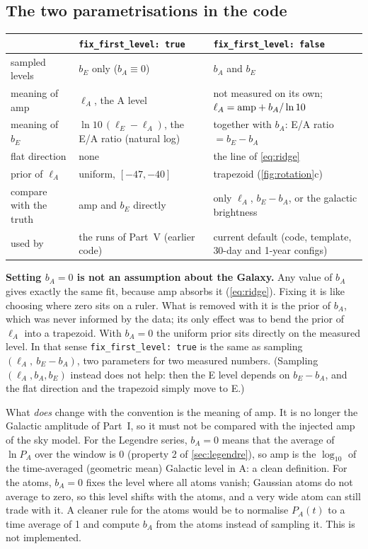 \documentclass[11pt,a4paper]{article}
\begin{document}
\subsection{The two parametrisations in the code}

\begin{center}
\footnotesize
\renewcommand{\arraystretch}{1.2}
\begin{tabular}{@{}p{3.2cm}p{5.6cm}p{5.6cm}@{}}
\toprule
 & \texttt{fix\_first\_level: true} & \texttt{fix\_first\_level: false} \\
\midrule
sampled levels & $b_E$ only ($b_A\equiv0$) & $b_A$ and $b_E$ \\
meaning of amp & $\ell_A$, the A level & not measured on its own; $\ell_A={\rm amp}+b_A/\ln10$ \\
meaning of $b_E$ & $\ln10\,(\ell_E-\ell_A)$, the E/A ratio (natural log) & together with $b_A$: E/A ratio $=b_E-b_A$ \\
flat direction & none & the line of \cref{eq:ridge} \\
prior of $\ell_A$ & uniform, $[-47,-40]$ & trapezoid (\cref{fig:rotation}c) \\
compare with the truth & amp and $b_E$ directly & only $\ell_A$, $b_E-b_A$, or the galactic brightness \\
used by & the runs of Part~V (earlier code) & current default (code, template, 30-day and 1-year configs) \\
\bottomrule
\end{tabular}
\end{center}

\textbf{Setting $b_A=0$ is not an assumption about the Galaxy.} Any value of $b_A$
gives exactly the same fit, because amp absorbs it (\cref{eq:ridge}). Fixing it is
like choosing where zero sits on a ruler. What is removed with it is the prior of
$b_A$, which was never informed by the data; its only effect was to bend the prior of
$\ell_A$ into a trapezoid. With $b_A=0$ the uniform prior sits directly on the
measured level. In that sense \texttt{fix\_first\_level: true} is the same as sampling
$(\ell_A,\ b_E-b_A)$, two parameters for two measured numbers. (Sampling
$(\ell_A,b_A,b_E)$ instead does not help: then the E level depends on $b_E-b_A$, and
the flat direction and the trapezoid simply move to E.)

What \emph{does} change with the convention is the meaning of amp. It is no longer
the Galactic amplitude of Part~I, so it must not be compared with the injected amp of
the sky model. For the Legendre series, $b_A=0$ means that the average of $\ln P_A$
over the window is 0 (property 2 of \cref{sec:legendre}), so amp is the $\log_{10}$ of
the time-averaged (geometric mean) Galactic level in A: a clean definition. For the
atoms, $b_A=0$ fixes the level where all atoms vanish; Gaussian atoms do not average
to zero, so this level shifts with the atoms, and a very wide atom can still trade
with it. A cleaner rule for the atoms would be to normalise $P_A(t)$ to a time
average of 1 and compute $b_A$ from the atoms instead of sampling it. This is not
implemented.
\end{document}
